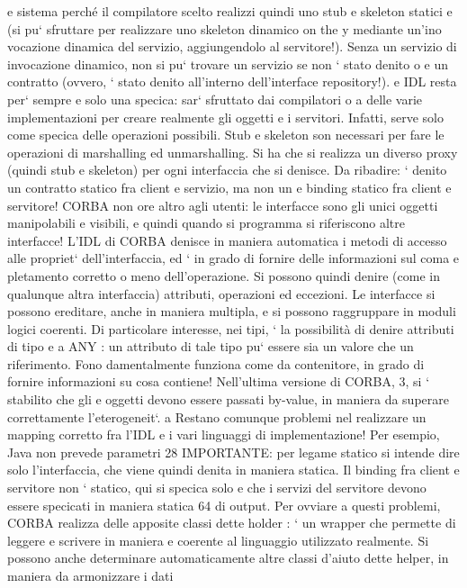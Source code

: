 \documentclass[a4paper,12pt]{article}
\begin{document}
e
sistema perché il compilatore scelto realizzi quindi uno stub e skeleton statici
e
(si pu` sfruttare per realizzare uno skeleton dinamico on the y mediante un'ino
vocazione dinamica del servizio, aggiungendolo al servitore!). Senza un servizio
di invocazione dinamico, non si pu` trovare un servizio se non ` stato denito
o
e
un contratto (ovvero, ` stato denito all'interno dell'interface repository!).
e
IDL resta per` sempre e solo una specica: sar` sfruttato dai compilatori
o
a
delle varie implementazioni per creare realmente gli oggetti e i servitori. Infatti,
serve solo come specica delle operazioni possibili.
Stub e skeleton son necessari per fare le operazioni di marshalling ed unmarshalling. Si ha che si realizza un diverso
proxy (quindi stub e skeleton) per ogni
interfaccia che si denisce.
Da ribadire: ` denito un contratto statico fra client e servizio, ma non un
e
binding statico fra client e servitore!
CORBA non ore altro agli utenti: le interfacce sono gli unici oggetti manipolabili e visibili, e quindi quando si
programma si riferiscono altre interfacce!
L'IDL di CORBA denisce in maniera automatica i metodi di accesso alle
propriet` dell'interfaccia, ed ` in grado di fornire delle informazioni sul coma
e
pletamento corretto o meno dell'operazione. Si possono quindi denire (come
in qualunque altra interfaccia) attributi, operazioni ed eccezioni. Le interfacce
si possono ereditare, anche in maniera multipla, e si possono raggruppare in
moduli logici coerenti.
Di particolare interesse, nei tipi, ` la possibilità di denire attributi di tipo
e
a
ANY : un attributo di tale tipo pu` essere sia un valore che un riferimento. Fono
damentalmente funziona come da contenitore, in grado di fornire informazioni
su cosa contiene! Nell'ultima versione di CORBA, 3, si ` stabilito che gli
e
oggetti devono essere passati by-value, in maniera da superare correttamente
l'eterogeneit`.
a
Restano comunque problemi nel realizzare un mapping corretto fra l'IDL e
i vari linguaggi di implementazione! Per esempio, Java non prevede parametri
28 IMPORTANTE: per legame statico si intende dire solo l'interfaccia, che viene quindi
denita in maniera statica. Il binding fra client e servitore non ` statico, qui si specica solo
e
che i servizi del servitore devono essere specicati in maniera statica
64
di output. Per ovviare a questi problemi, CORBA realizza delle apposite classi dette holder : ` un wrapper che permette
di leggere e scrivere in maniera
e
coerente al linguaggio utilizzato realmente. Si possono anche determinare automaticamente altre classi d'aiuto dette
helper, in maniera da armonizzare i dati
\end{document}

